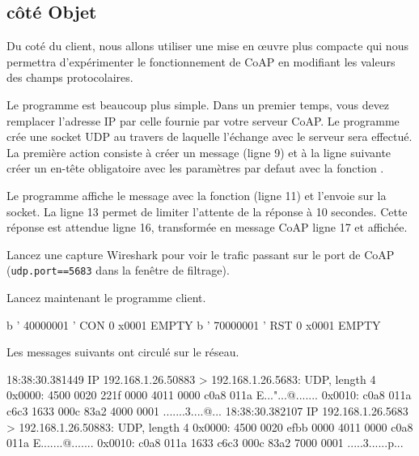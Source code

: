\subsection{côté Objet}

Du coté du client, nous allons utiliser une mise en œuvre plus compacte qui nous permettra d’expérimenter le fonctionnement de CoAP en modifiant les valeurs des champs protocolaires.

         \vspace{1em}


Le programme  est beaucoup plus simple. Dans un premier temps, vous devez remplacer l’adresse IP par celle fournie par votre serveur CoAP. Le programme crée une socket UDP au travers de laquelle l’échange avec le serveur sera effectué. La première action consiste à créer un message  (ligne 9) et à  la ligne suivante créer un en-tête obligatoire avec les paramètres par defaut avec la fonction .

Le programme affiche le message avec la fonction  (ligne 11) et l’envoie sur la socket. La ligne 13 permet de limiter l’attente de la réponse à 10 secondes. Cette réponse est attendue ligne 16, transformée en message CoAP ligne 17 et affichée.

         \vspace{1em}

Lancez une capture Wireshark pour voir le trafic passant sur le port de CoAP (\texttt{udp.port==5683} dans la fenêtre de filtrage).

         \vspace{1em}

Lancez maintenant le programme client.

\begin{termc}[backgroundcolor=\color{gray!10}, basicstyle=\ttfamily\small, escapechar=@] 
b ’ 40000001 ’
CON 0 x0001 EMPTY
b ’ 70000001 ’
RST 0 x0001 EMPTY
\end{termc}

Les messages suivants ont circulé sur le réseau.

\begin{termc}[backgroundcolor=\color{blue!10}, basicstyle=\ttfamily\tiny, ] 
18:38:30.381449 IP 192.168.1.26.50883 > 192.168.1.26.5683: UDP, length 4
	0x0000:  4500 0020 221f 0000 4011 0000 c0a8 011a  E..."...@.......
	0x0010:  c0a8 011a c6c3 1633 000c 83a2 4000 0001  .......3....@...
18:38:30.382107 IP 192.168.1.26.5683 > 192.168.1.26.50883: UDP, length 4
	0x0000:  4500 0020 efbb 0000 4011 0000 c0a8 011a  E.......@.......
	0x0010:  c0a8 011a 1633 c6c3 000c 83a2 7000 0001  .....3......p...
\end{termc}

